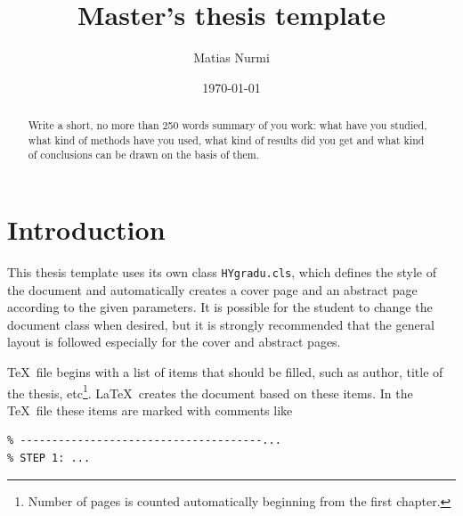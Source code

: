 \documentclass[english,twoside,openright]{HYgradu}
\title{Master's thesis template}
\author{Matias Nurmi}
\date{\today}
\begin{document}
\maketitle


\begin{abstract}
  Write a short, no more than 250 words summary of you work: what have
  you studied, what kind of methods have you used, what kind of
  results did you get and what kind of conclusions can be drawn on the
  basis of them.
\end{abstract}

\mytableofcontents
\mynomenclature


\chapter{Introduction}

This thesis template uses its own class \texttt{HYgradu.cls}, which
defines the style of the document and automatically creates a cover
page and an abstract page according to the given parameters. It is
possible for the student to change the document class when desired,
but it is strongly recommended that the general layout is followed
especially for the cover and abstract pages.

\TeX\ file begins with a list of items that should be filled, such as
author, title of the thesis, etc\footnote{Number of pages is counted
  automatically beginning from the first chapter.}. \LaTeX\ creates the
document based on these items. In the \TeX\ file these items are marked
with comments like
\begin{verbatim}
% --------------------------------------...
% STEP 1: ...
\end{verbatim}
\end{document}
